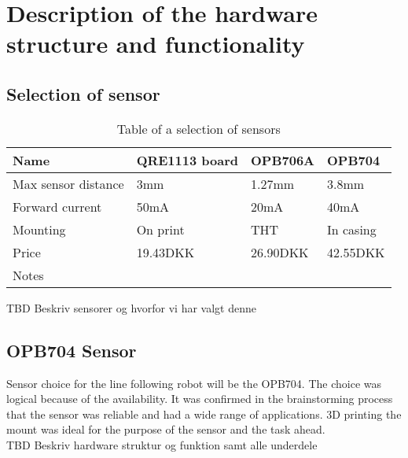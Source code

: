 \section{Description of the hardware structure and functionality}
\subsection{Selection of sensor}
\begin{table}[htbp]
    \begin{tabular}{|l|l|l|l|}
        \hline
        Name                & QRE1113 board & OPB706A  & OPB704    \\ \hline
        Max sensor distance & 3mm                            & 1.27mm   & 3.8mm     \\ \hline
        Forward current     & 50mA                           & 20mA     & 40mA      \\ \hline
        Mounting            & On print                       & THT      & In casing \\ \hline
        Price               & 19.43DKK                       & 26.90DKK & 42.55DKK  \\ \hline
        Notes               & ~                              & ~        & ~         \\
        \hline
    \end{tabular}
    \caption{Table of a selection of sensors}
\label{sensor_tabel}
\end{table}
TBD Beskriv sensorer og hvorfor vi har valgt denne
\newline
\subsection{OPB704 Sensor}
Sensor choice for the line following robot will be the OPB704. The choice was logical because of the availability. It was confirmed in the brainstorming process that the sensor was reliable and had a wide range of applications. 3D printing the mount was ideal for the purpose of the sensor and the task ahead.
\newline 
\\
TBD Beskriv hardware 
struktur og funktion samt alle underdele
